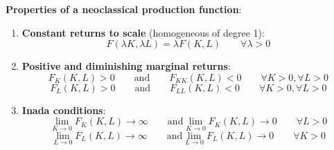 \textbf{Properties of a neoclassical production function}: \begin{enumerate}
    \item \textbf{Constant returns to scale} (homogeneous of degree 1): \[
              F(\lambda K, \lambda L) = \lambda F(K,L) \qquad \forall \lambda > 0
          \]
    \item \textbf{Positive and diminishing marginal returns}: \[
              F_K(K,L) > 0 \qquad \text{and} \qquad F_{KK}(K,L) < 0 \qquad \forall K > 0, \forall L > 0
          \] \[
              F_L(K,L) > 0 \qquad \text{and} \qquad F_{LL}(K,L) < 0 \qquad \forall K > 0, \forall L > 0
          \]
    \item \textbf{Inada conditions}: \[
              \lim_{K \to 0} F_K(K,L) \to \infty \qquad \text{and} \lim_{K \to 0} F_K(K,L) \to 0 \qquad \forall L > 0
          \] \[
              \lim_{L \to 0} F_L(K,L) \to \infty \qquad \text{and} \lim_{L \to 0} F_L(K,L) \to 0 \qquad \forall K > 0
          \]
\end{enumerate}




